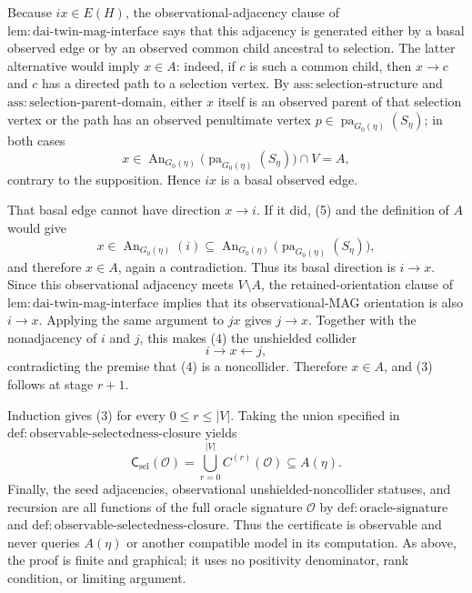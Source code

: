 Because \(ix\in E(H)\), the observational-adjacency clause of \(\mathrm{lem:dai\mbox{-}twin\mbox{-}mag\mbox{-}interface}\) says that this adjacency is generated either by a basal observed edge or by an observed common child ancestral to selection.  The latter alternative would imply \(x\in A\): indeed, if \(c\) is such a common child, then \(x\to c\) and \(c\) has a directed path to a selection vertex.  By \(\mathrm{ass:selection\mbox{-}structure}\) and \(\mathrm{ass:selection\mbox{-}parent\mbox{-}domain}\), either \(x\) itself is an observed parent of that selection vertex or the path has an observed penultimate vertex \(p\in\operatorname{pa}_{G_0(\eta)}(S_\eta)\); in both cases
\[
x\in\operatorname{An}_{G_0(\eta)}
   \bigl(\operatorname{pa}_{G_0(\eta)}(S_\eta)\bigr)\cap V
=A,
\]
contrary to the supposition.  Hence \(ix\) is a basal observed edge.

That basal edge cannot have direction \(x\to i\).  If it did, (5) and the definition of \(A\) would give
\[
x\in\operatorname{An}_{G_0(\eta)}(i)
\subseteq
\operatorname{An}_{G_0(\eta)}
   \bigl(\operatorname{pa}_{G_0(\eta)}(S_\eta)\bigr),
\]
and therefore \(x\in A\), again a contradiction.  Thus its basal direction is \(i\to x\).  Since this observational adjacency meets \(V\setminus A\), the retained-orientation clause of \(\mathrm{lem:dai\mbox{-}twin\mbox{-}mag\mbox{-}interface}\) implies that its observational-MAG orientation is also \(i\to x\).  Applying the same argument to \(jx\) gives \(j\to x\).  Together with the nonadjacency of \(i\) and \(j\), this makes (4) the unshielded collider
\[
i\to x\leftarrow j,
\]
contradicting the premise that (4) is a noncollider.  Therefore \(x\in A\), and (3) follows at stage \(r+1\).

Induction gives (3) for every \(0\le r\le |V|\).  Taking the union specified in \(\mathrm{def:observable\mbox{-}selectedness\mbox{-}closure}\) yields
\[
\mathsf C_{\mathrm{sel}}(\mathcal O)
=\bigcup_{r=0}^{|V|}C^{(r)}(\mathcal O)
\subseteq A(\eta).
\]
Finally, the seed adjacencies, observational unshielded-noncollider statuses, and recursion are all functions of the full oracle signature \(\mathcal O\) by \(\mathrm{def:oracle\mbox{-}signature}\) and \(\mathrm{def:observable\mbox{-}selectedness\mbox{-}closure}\).  Thus the certificate is observable and never queries \(A(\eta)\) or another compatible model in its computation.  As above, the proof is finite and graphical; it uses no positivity denominator, rank condition, or limiting argument.
